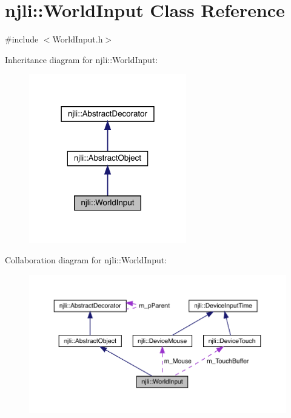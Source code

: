 \hypertarget{classnjli_1_1_world_input}{}\section{njli\+:\+:World\+Input Class Reference}
\label{classnjli_1_1_world_input}


{\ttfamily \#include $<$World\+Input.\+h$>$}



Inheritance diagram for njli\+:\+:World\+Input\+:\nopagebreak
\begin{figure}[H]
\begin{center}
\leavevmode
\includegraphics[width=194pt]{classnjli_1_1_world_input__inherit__graph}
\end{center}
\end{figure}


Collaboration diagram for njli\+:\+:World\+Input\+:\nopagebreak
\begin{figure}[H]
\begin{center}
\leavevmode
\includegraphics[width=350pt]{classnjli_1_1_world_input__coll__graph}
\end{center}
\end{figure}

